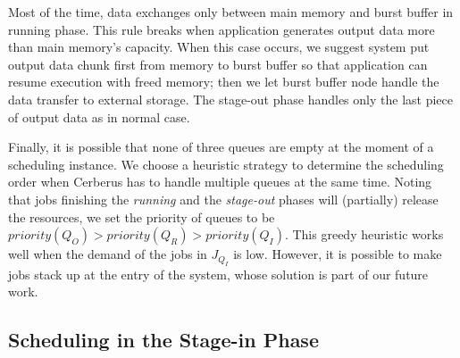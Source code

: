 Most of the time, data exchanges only between main memory and burst buffer in running phase.
This rule breaks when application generates output data more than main memory's capacity.
When this case occurs, we suggest system put output data chunk first from memory to burst buffer
so that application can resume execution with freed memory;
then we let burst buffer node handle the data transfer to external storage.
The stage-out phase handles only the last piece of output data as in normal case.

Finally, it is possible that none of three queues are empty at the moment of a scheduling instance.
We choose a heuristic strategy to determine the scheduling order when
Cerberus has to handle multiple queues at the same time.
Noting that jobs finishing the \textit{running} and the \textit{stage-out} phases will
(partially) release the resources,
we set the priority of queues to be $priority(Q_O) > priority(Q_R) > priority(Q_I)$.
This greedy heuristic works well when the demand of the jobs in $J_{Q_I}$ is low.
However, it is possible to make jobs stack up at the entry of the system,
whose solution is part of our future work.


\subsection{Scheduling in the Stage-in Phase}
\label{SubSec:OptStageIn}

